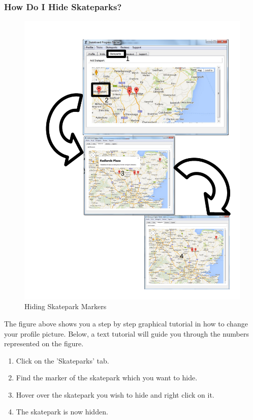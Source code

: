 \subsubsection{How Do I Hide Skateparks?} 

\begin{figure}[H]
    \includegraphics[width=\textwidth]{./Manual/Images/HideSkatepark.pdf}
    \caption{Hiding Skatepark Markers} \label{fig:Hide Skatepark}
\end{figure}

The figure above shows you a step by step graphical tutorial in how to change your profile picture. Below, a text tutorial will guide you through the numbers represented on the figure.

\begin{enumerate}
\item Click on the 'Skateparks' tab.
\item Find the marker of the skatepark which you want to hide.
\item Hover over the skatepark you wish to hide and right click on it.
\item The skatepark is now hidden.
\end{enumerate}



